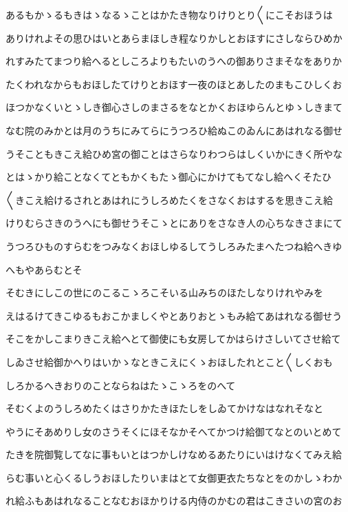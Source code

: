\documentclass[a4paper,11pt,landscape]{ltjtarticle}
\begin{document}
あるもかゝるもきはゝなるゝことはかたき物なりけりとり〱にこそおほうは
\par\medskip
ありけれよその思ひはいとあらまほしき程なりかしとおほすにさしならひめか
\par\medskip
れすみたてまつり給へるとしころよりもたいのうへの御ありさまそなをありか
\par\medskip
たくわれなからもおほしたてけりとおほす一夜のほとあしたのまもこひしくお
\par\medskip
ほつかなくいとゝしき御心さしのまさるをなとかくおほゆらんとゆゝしきまて
\par\medskip
なむ院のみかとは月のうちにみてらにうつろひ給ぬこのゐんにあはれなる御せ
\par\medskip
うそこともきこえ給ひめ宮の御ことはさらなりわつらはしくいかにきく所やな
\par\medskip
とはゝかり給ことなくてともかくもたゝ御心にかけてもてなし給へくそたひ
\par\medskip
〱きこえ給けるされとあはれにうしろめたくをさなくおはするを思きこえ給
\par\medskip
けりむらさきのうへにも御せうそこゝとにありをさなき人の心ちなきさまにて
\par\medskip
うつろひものすらむをつみなくおほしゆるしてうしろみたまへたつね給へきゆ
\par\medskip
へもやあらむとそ
\par\medskip
そむきにしこの世にのこるこゝろこそいる山みちのほたしなりけれやみを
\par\medskip
えはるけてきこゆるもおこかましくやとありおとゝもみ給てあはれなる御せう
\par\medskip
そこをかしこまりきこえ給へとて御使にも女房してかはらけさしいてさせ給て
\par\medskip
しゐさせ給御かへりはいかゝなときこえにくゝおほしたれとこと〱しくおも
\par\medskip
しろかるへきおりのことならねはたゝこゝろをのへて
\par\medskip
そむくよのうしろめたくはさりかたきほたしをしゐてかけなはなれそなと
\par\medskip
やうにそあめりし女のさうそくにほそなかそへてかつけ給御てなとのいとめて
\par\medskip
たきを院御覧してなに事もいとはつかしけなめるあたりにいはけなくてみえ給
\par\medskip
らむ事いと心くるしうおほしたりいまはとて女御更衣たちなとをのかしゝわか
\par\medskip
れ給ふもあはれなることなむおほかりける内侍のかむの君はこきさいの宮のお
\par\medskip
\end{document}
